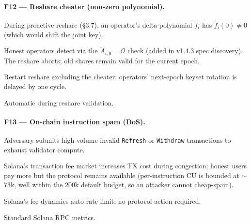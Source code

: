 \paragraph{F12 --- Reshare cheater (non-zero polynomial).}
\begin{description}[leftmargin=2em,style=nextline,itemsep=0pt]
  \item[Trigger] During proactive reshare (\S3.7), an operator's
    delta-polynomial $\tilde{f}_i$ has $\tilde{f}_i(0) \neq 0$
    (which would shift the joint key).
  \item[Consequence] Honest operators detect via the
    $\tilde{A}_{i,0} = \mathcal{O}$ check (added in v1.4.3 spec
    discovery). The reshare aborts; old shares remain valid for
    the current epoch.
  \item[Recovery] Restart reshare excluding the cheater; operators'
    next-epoch keyset rotation is delayed by one cycle.
  \item[Detection] Automatic during reshare validation.
\end{description}

\paragraph{F13 --- On-chain instruction spam (DoS).}
\begin{description}[leftmargin=2em,style=nextline,itemsep=0pt]
  \item[Trigger] Adversary submits high-volume invalid \texttt{Refresh}
    or \texttt{Withdraw} transactions to exhaust validator compute.
  \item[Consequence] Solana's transaction fee market increases TX cost
    during congestion; honest users pay more but the protocol remains
    available (per-instruction CU is bounded at $\sim$73k, well within
    the 200k default budget, so an attacker cannot cheap-spam).
  \item[Recovery] Solana's fee dynamics auto-rate-limit; no protocol
    action required.
  \item[Detection] Standard Solana RPC metrics.
\end{description}

